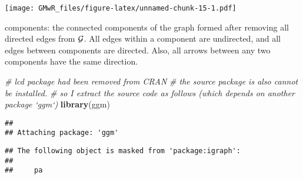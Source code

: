\documentclass[]{article}
\newenvironment{Shaded}{\begin{snugshade}}{\end{snugshade}}
\newcommand{\KeywordTok}[1]{\textcolor[rgb]{0.13,0.29,0.53}{\textbf{#1}}}
\newcommand{\CommentTok}[1]{\textcolor[rgb]{0.56,0.35,0.01}{\textit{#1}}}
\newcommand{\NormalTok}[1]{#1}
\begin{document}
\texttt{[image: GMwR\_files/figure-latex/unnamed-chunk-15-1.pdf]}

components: the connected components of the graph formed after removing
all directed edges from \(\cal G\). All edges within a component are
undirected, and all edges between components are directed. Also, all
arrows between any two components have the same direction.

\begin{Shaded}
\begin{Highlighting}[]
\CommentTok{# lcd package had been removed from CRAN}
\CommentTok{# the source package is also cannot be installed.}
\CommentTok{# so I extract the source code as follows (which depends on another package `ggm`)}
\KeywordTok{library}\NormalTok{(ggm)}
\end{Highlighting}
\end{Shaded}

\begin{verbatim}
## 
## Attaching package: 'ggm'
\end{verbatim}

\begin{verbatim}
## The following object is masked from 'package:igraph':
## 
##     pa
\end{verbatim}
\end{document}
